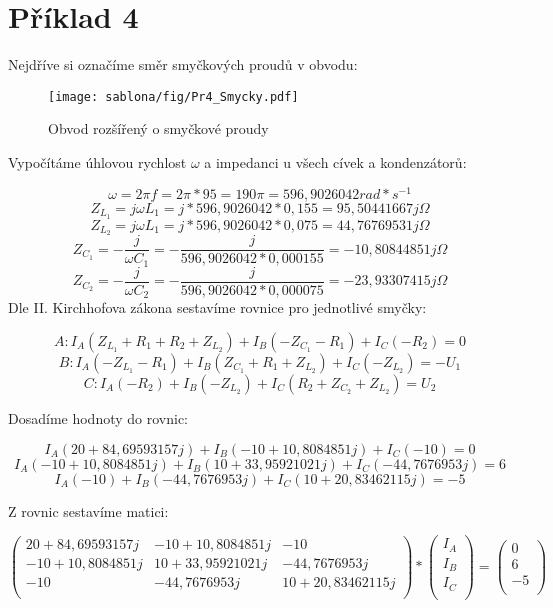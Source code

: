 \section{Příklad 4}

Nejdříve si označíme směr smyčkových proudů v obvodu:
\begin{figure}[htb]
  \centering
  \texttt{[image: sablona/fig/Pr4\_Smycky.pdf]} 
  \caption{Obvod rozšířený o smyčkové proudy}
\end{figure} %
\newline

Vypočítáme úhlovou rychlost $\omega$ a impedanci u všech cívek a kondenzátorů:
\newline

$$\omega = 2\pi\mathit{f} = 2\pi*95 = 190\pi = 596,9026042 rad * s^{-1}$$ 
$$Z_{L_1} = j\omega L_1 = j * 596,9026042 * 0,155 = 95,50441667j \Omega$$ 
$$Z_{L_2} = j\omega L_1 = j * 596,9026042 * 0,075 = 44,76769531j \Omega$$
$$Z_{C_1} = -\frac{j}{\omega C_1} = -\frac{j}{596,9026042*0,000155} = -10,80844851j\Omega$$
$$Z_{C_2} = -\frac{j}{\omega C_2} = -\frac{j}{596,9026042*0,000075} = -23,93307415j \Omega$$
\newpage
Dle II. Kirchhofova zákona sestavíme rovnice pro jednotlivé smyčky:
\newline

$$A: I_A(Z_{L_1}+R_1+R_2+Z_{L_2}) + I_B(-Z_{C_1}-R_1) + I_C(-R_2) = 0$$
$$B: I_A(-Z_{L_1}-R_1) + I_B(Z_{C_1}+R_1+Z_{L_2}) + I_C(-Z_{L_2}) = -U_1$$
$$C: I_A(-R_2) + I_B(-Z_{L_2}) + I_C(R_2+Z_{C_2}+Z_{L_2}) = U_2$$
\newline

Dosadíme hodnoty do rovnic:
\newline

$$I_A(20+84,69593157j) + I_B(-10+10,8084851j) + I_C(-10) = 0$$
$$I_A(-10+10,8084851j) + I_B(10+33,95921021j) + I_C(-44,7676953j) = 6$$
$$I_A(-10) + I_B(-44,7676953j) + I_C(10+20,83462115j) = -5$$
\newline

Z rovnic sestavíme matici:

\[
\left(
\begin{array}{ccc}
20+84,69593157j & -10+10,8084851j & -10\\
-10+10,8084851j & 10+33,95921021j & -44,7676953j\\
-10 & -44,7676953j & 10+20,83462115j\\
\end{array}
\right)
*
\left(
\begin{array}{c}
I_A\\
I_B\\
I_C\\
\end{array}
\right)
=
\left(
\begin{array}{c}
0\\
6\\
-5\\
\end{array}
\right)
\]
\newline
\newline

